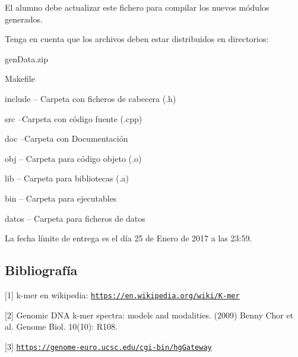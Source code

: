 El alumno debe actualizar este fichero para compilar los nuevos módulos generados.

Tenga en cuenta que los archivos deben estar distribuidos en directorios\+:

gen\+Data.\+zip \begin{DoxyItemize}
\item Makefile \item include -- Carpeta con ficheros de cabecera (.h) \item src --Carpeta con código fuente (.cpp) \item doc --Carpeta con Documentación \item obj -- Carpeta para código objeto (.o) \item lib -- Carpeta para bibliotecas (.a) \item bin -- Carpeta para ejecutables \item datos -- Carpeta para ficheros de datos\end{DoxyItemize}
La fecha límite de entrega es el día 25 de Enero de 2017 a las 23\+:59.\hypertarget{index_bibliografia}{}\subsection{Bibliografía}\label{index_bibliografia}
\mbox{[}1\mbox{]} k-\/mer en wikipedia\+: \href{https://en.wikipedia.org/wiki/K-mer}{\tt https\+://en.\+wikipedia.\+org/wiki/\+K-\/mer}

\mbox{[}2\mbox{]} Genomic D\+NA k-\/mer spectra\+: models and modalities. (2009) Benny Chor et al. Genome Biol. 10(10)\+: R108.

\mbox{[}3\mbox{]} \href{https://genome-euro.ucsc.edu/cgi-bin/hgGateway}{\tt https\+://genome-\/euro.\+ucsc.\+edu/cgi-\/bin/hg\+Gateway} 